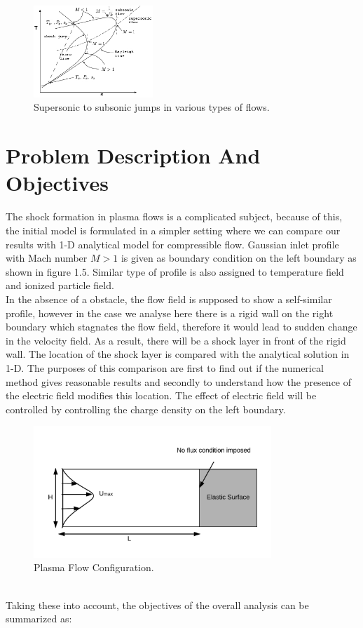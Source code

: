 \documentclass[12pt]{report}
\begin{document}
\begin{figure}
\label{fig:shockflows}
\centering
\includegraphics[width=0.4\textwidth]{shockTS.jpg}
\caption{Supersonic to subsonic jumps in various types of flows.}
\end{figure}

\section{Problem Description And Objectives}
The shock formation in plasma flows is a complicated subject, because of this, the initial model is formulated in a simpler setting where we can compare our results with 1-D analytical model for compressible flow. Gaussian inlet profile with Mach number $M>1$ is given as boundary condition on the left boundary as shown in figure 1.5. Similar type of profile is also assigned to temperature field and ionized particle field. 
\\
In the absence of a obstacle, the flow field is supposed to show a self-similar profile, however in
\newpage
 the case we analyse here there is a rigid wall on the right boundary which stagnates the flow field, therefore it would lead to sudden change in the velocity field.  As a result, there will be a shock layer in front of the rigid wall. The location of the shock layer is compared with the analytical solution in 1-D\cite{Johnson}. The purposes of this comparison are first to find out if the numerical method gives reasonable results and secondly to understand how the presence of the electric field modifies this location. The effect of electric field will be controlled by controlling the charge density on the left boundary.
\begin{figure}
\label{fig:2DPlasmaDesc}
\centering
\includegraphics[width=0.8\textwidth]{2DPlasmaSurfaceInteraction.png}
\caption{Plasma Flow Configuration.}
\end{figure}
\\
Taking these into account, the objectives of the overall analysis can be summarized as:
\end{document}
